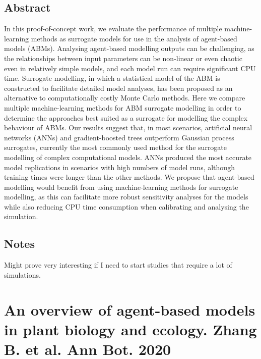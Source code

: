 \documentclass[11pt,a4paper]{article}
\begin{document}
\subsection*{Abstract}
In this proof-of-concept work, we evaluate the performance of multiple machine-learning methods as surrogate models for use in the analysis of agent-based models (ABMs). Analysing agent-based modelling outputs can be challenging, as the relationships between input parameters can be non-linear or even chaotic even in relatively simple models, and each model run can require significant CPU time. Surrogate modelling, in which a statistical model of the ABM is constructed to facilitate detailed model analyses, has been proposed as an alternative to computationally costly Monte Carlo methods. Here we compare multiple machine-learning methods for ABM surrogate modelling in order to determine the approaches best suited as a surrogate for modelling the complex behaviour of ABMs. Our results suggest that, in most scenarios, artificial neural networks (ANNs) and gradient-boosted trees outperform Gaussian process surrogates, currently the most commonly used method for the surrogate modelling of complex computational models. ANNs produced the most accurate model replications in scenarios with high numbers of model runs, although training times were longer than the other methods. We propose that agent-based modelling would benefit from using machine-learning methods for surrogate modelling, as this can facilitate more robust sensitivity analyses for the models while also reducing CPU time consumption when calibrating and analysing the simulation.

\subsection*{Notes}
Might prove very interesting if I need to start studies that require a lot of simulations.

\section*{An overview of agent-based models in plant biology and ecology. Zhang B. et al. Ann Bot. 2020}
\end{document}
